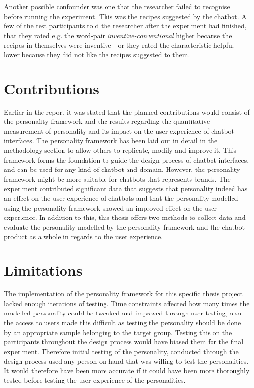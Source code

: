 Another possible confounder was one that the researcher failed to recognise before running the experiment. This was the recipes suggested by the chatbot. A few of the test participants told the researcher after the experiment had finished, that they rated e.g. the word-pair \textit{inventive-conventional} higher because the recipes in themselves were inventive - or they rated the characteristic helpful lower because they did not like the recipes suggested to them. 

\section{Contributions}

Earlier in the report it was stated that the planned contributions would consist of the personality framework and the results regarding the quantitative measurement of personality and its impact on the user experience of chatbot interfaces. The personality framework has been laid out in detail in the methodology section to allow others to replicate, modify and improve it. This framework forms the foundation to guide the design process of chatbot interfaces, and can be used for any kind of chatbot and domain. However, the personality framework might be more suitable for chatbots that represents brands. The experiment contributed significant data that suggests that personality indeed has an effect on the user experience of chatbots and that the personality modelled using the personality framework showed an improved effect on the user experience. In addition to this, this thesis offers two methods to collect data and evaluate the personality modelled by the personality framework and the chatbot product as a whole in regards to the user experience. 

\section{Limitations}

The implementation of the personality framework for this specific thesis project lacked enough iterations of testing. Time constraints affected how many times the modelled personality could be tweaked and improved through user testing, also the access to users made this difficult as testing the personality should be done by an appropriate sample belonging to the target group. Testing this on the participants throughout the design process would have biased them for the final experiment. Therefore initial testing of the personality, conducted through the design process used any person on hand that was willing to test the personalities. It would therefore have been more accurate if it could have been more thoroughly tested before testing the user experience of the personalities.

